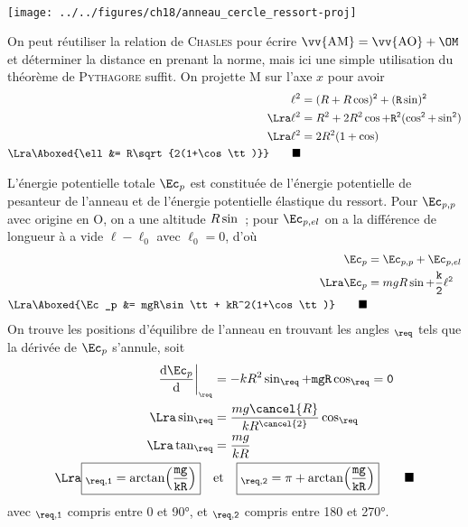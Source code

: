 \documentclass[a4paper, 11pt]{book}
\newcommand{\qed}{\tag*{$\blacksquare$}}
\begin{document}
{
    \begin{minipage}[t]{0.25\linewidth}
        ~
        \begin{center}
            \texttt{[image: ../../figures/ch18/anneau\_cercle\_ressort-proj]}
            \captionsetup{justification=centering}
            \label{fig:anncercproj}
        \end{center}
    \end{minipage}
    \hfill
    \begin{minipage}[t]{0.70\linewidth}
        On peut réutiliser la relation de \textsc{Chasles} pour écrire
        $\vv{\rm AM} = \vv{\rm AO} + \OM$ et déterminer la distance en prenant
        la norme, mais ici une simple utilisation du théorème de
        \textsc{Pythagore} suffit. On projette M sur l'axe $x$ pour avoir
        \begin{align*}
            \ell^2 &= (R+R\cos\tt)^2 + (R\sin\tt)^2
            \\\Lra
            \ell^2 &= R^2 + 2R^2\cos\tt + R^2(\cos^2\tt + \sin^2\tt)
            \\\Lra
            \ell^2 &= 2R^2(1+\cos\tt)
            \\\Lra
            \Aboxed{\ell &= R\sqrt{2(1+\cos\tt)}}
            \qed
        \end{align*}
    \end{minipage}
}
{L'énergie potentielle totale $\Ec_p$ est constituée de l'énergie
    potentielle de pesanteur de l'anneau et de l'énergie potentielle
    élastique du ressort. Pour $\Ec_{p,p}$ avec origine en O, on a une
    altitude $R\sin\tt$~; pour $\Ec_{p,el}$ on a la différence de longueur à
    a vide $\ell -\ell_0$ avec $\ell_0 = 0$, d'où
    \begin{align*}
        \Ec_p &= \Ec_{p,p} + \Ec_{p,el}
        \\\Lra
        \Ec_p &= mgR\sin\tt + \frac{k}{2}\ell^2
        \\\Lra
        \Aboxed{\Ec_p &= mgR\sin\tt + kR^2(1+\cos\tt)}
        \qed
    \end{align*}
}
{On trouve les positions d'équilibre de l'anneau en trouvant les angles
    $\tt_{\req}$ tels que la dérivée de $\Ec_p$ s'annule, soit
    \begin{align*}
        \eval{\dv{\Ec_p}{\tt}}_{\tt_{\req}} &= -kR^2\sin\tt_{\req} +
        mgR\cos\tt_{\req} = 0
        \\\Lra
        \sin\tt_{\req} &= \frac{mg\cancel{R}}{kR^{\cancel{2}}}\cos\tt_{\req}
        \\\Lra
        \tan\tt_{\req} &= \frac{mg}{kR}
        \\\Lra
        \boxed{\tt_{\req,1} = \arctan(\frac{mg}{kR})}
        \quad&\text{et}\quad
        \boxed{\tt_{\req,2} = \pi + \arctan(\frac{mg}{kR})}
        \qed
    \end{align*}
    avec $\tt_{\req,1}$ compris entre 0 et \ang{90}, et $\tt_{\req,2}$ compris
    entre 180 et \ang{270}.
}
\end{document}
